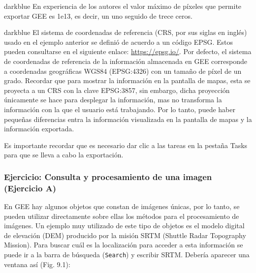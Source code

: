 \documentclass[
  12pt,
  letterpaper,
  twoside]{book}
\begin{document}
\begin{bluebox2}

\begin{awesomeblock}{5pt}{\faLightbulb}{darkblue}
En experiencia de los autores el valor máximo de píxeles que permite exportar GEE es 1e13, es decir, un uno seguido de trece ceros.

\end{awesomeblock}

\end{bluebox2}

\begin{bluebox2}

\begin{awesomeblock}{5pt}{\faLightbulb}{darkblue}
El sistema de coordenadas de referencia (CRS, por sus siglas en inglés) usado en el ejemplo anterior se definió de acuerdo a un código EPSG. Estos pueden consultarse en el siguiente enlace: \url{https://epsg.io/}. Por defecto, el sistema de coordenadas de referencia de la información almacenada en GEE corresponde a coordenadas geográficas WGS84 (EPSG:4326) con un tamaño de píxel de un grado. Recordar que para mostrar la información en la pantalla de mapas, esta se proyecta a un CRS con la clave EPSG:3857, sin embargo, dicha proyección únicamente se hace para desplegar la información, mas no transforma la información con la que el usuario está trabajando. Por lo tanto, puede haber pequeñas diferencias entra la información visualizada en la pantalla de mapas y la información exportada.

\end{awesomeblock}

\end{bluebox2}

Es importante recordar que es necesario dar clic a las tareas en la pestaña Tasks para que se lleva a cabo la exportación.

\hypertarget{ejercicio-consulta-y-procesamiento-de-una-imagen-ejercicio-a}{%
\subsubsection*{Ejercicio: Consulta y procesamiento de una imagen (Ejercicio A)}\label{ejercicio-consulta-y-procesamiento-de-una-imagen-ejercicio-a}}

En GEE hay algunos objetos que constan de imágenes únicas, por lo tanto, se pueden utilizar directamente sobre ellas los métodos para el procesamiento de imágenes. Un ejemplo muy utilizado de este tipo de objetos es el modelo digital de elevación (DEM) producido por la misión SRTM (Shuttle Radar Topography Mission). Para buscar cuál es la localización para acceder a esta información se puede ir a la barra de búsqueda (\texttt{Search}) y escribir SRTM. Debería aparecer una ventana así (Fig. 9.1):
\end{document}
